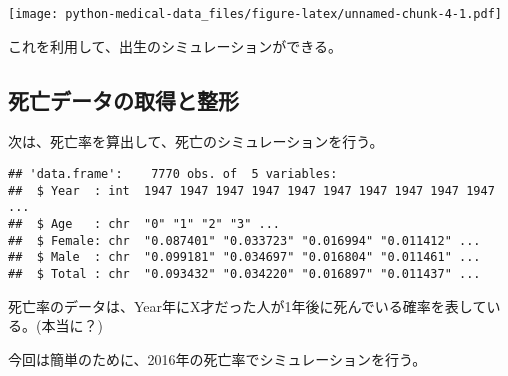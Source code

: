 \documentclass[
]{book}
\newenvironment{Shaded}{\begin{snugshade}}{\end{snugshade}}
\newcommand{\DataTypeTok}[1]{\textcolor[rgb]{0.13,0.29,0.53}{#1}}
\newcommand{\DecValTok}[1]{\textcolor[rgb]{0.00,0.00,0.81}{#1}}
\newcommand{\KeywordTok}[1]{\textcolor[rgb]{0.13,0.29,0.53}{\textbf{#1}}}
\newcommand{\NormalTok}[1]{#1}
\newcommand{\OperatorTok}[1]{\textcolor[rgb]{0.81,0.36,0.00}{\textbf{#1}}}
\newcommand{\OtherTok}[1]{\textcolor[rgb]{0.56,0.35,0.01}{#1}}
\newcommand{\StringTok}[1]{\textcolor[rgb]{0.31,0.60,0.02}{#1}}
\begin{document}
\texttt{[image: python-medical-data\_files/figure-latex/unnamed-chunk-4-1.pdf]}

これを利用して、出生のシミュレーションができる。

\hypertarget{ux6b7bux4ea1ux30c7ux30fcux30bfux306eux53d6ux5f97ux3068ux6574ux5f62}{%
\subsection{死亡データの取得と整形}\label{ux6b7bux4ea1ux30c7ux30fcux30bfux306eux53d6ux5f97ux3068ux6574ux5f62}}

次は、死亡率を算出して、死亡のシミュレーションを行う。

\begin{Shaded}
\end{Shaded}

\begin{verbatim}
## 'data.frame':	7770 obs. of  5 variables:
##  $ Year  : int  1947 1947 1947 1947 1947 1947 1947 1947 1947 1947 ...
##  $ Age   : chr  "0" "1" "2" "3" ...
##  $ Female: chr  "0.087401" "0.033723" "0.016994" "0.011412" ...
##  $ Male  : chr  "0.099181" "0.034697" "0.016804" "0.011461" ...
##  $ Total : chr  "0.093432" "0.034220" "0.016897" "0.011437" ...
\end{verbatim}

死亡率のデータは、Year年にX才だった人が1年後に死んでいる確率を表している。(本当に？)

今回は簡単のために、2016年の死亡率でシミュレーションを行う。

\begin{Shaded}
\end{Shaded}
\end{document}
